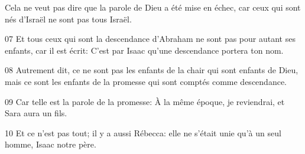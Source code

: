 Cela ne veut pas dire que la parole de Dieu a été mise en échec, car ceux qui sont nés d’Israël ne sont pas tous Israël.

07 Et tous ceux qui sont la descendance d’Abraham ne sont pas pour autant ses enfants, car il est écrit: C’est par Isaac qu’une descendance portera ton nom.

08 Autrement dit, ce ne sont pas les enfants de la chair qui sont enfants de Dieu, mais ce sont les enfants de la promesse qui sont comptés comme descendance.

09 Car telle est la parole de la promesse: À la même époque, je reviendrai, et Sara aura un fils.

10 Et ce n’est pas tout; il y a aussi Rébecca: elle ne s’était unie qu’à un seul homme, Isaac notre père.